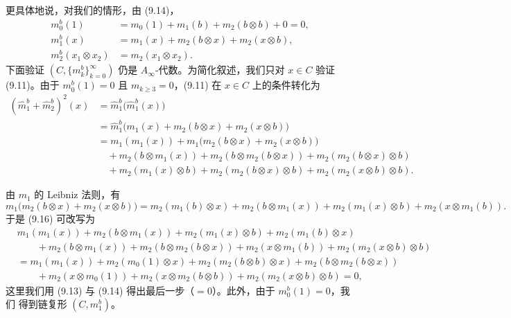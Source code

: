 更具体地说，对我们的情形，由 (9.14)，
\begin{equation*}
\begin{aligned}
  m_0^b(1)&=m_0(1)+m_1(b)+m_2(b\otimes b)+0=0,\\
  m_1^b(x)&=m_1(x)+m_2(b\otimes x)+m_2(x\otimes b),\\
  m_2^b(x_1\otimes x_2)&=m_2(x_1\otimes x_2).
\end{aligned}
\end{equation*}
下面验证 $(C,\{m_k^b\}_{k=0}^\infty)$ 仍是 $A_\infty$-代数。为简化叙述，我们只对
$x\in C$ 验证 (9.11)。由于 $m_0^b(1)=0$ 且 $m_{k\geqslant3}=0$，(9.11) 在
$x\in C$ 上的条件转化为
\begin{equation}\tag{9.16}
\begin{aligned}
  (\hat m_1^b+\hat m_2^b)^2(x)
  &=\hat m_1^b\bigl(\hat m_1^b(x)\bigr)\\
  &=\hat m_1^b\bigl(m_1(x)+m_2(b\otimes x)+m_2(x\otimes b)\bigr)\\
  &=m_1(m_1(x))+m_1\bigl(m_2(b\otimes x)+m_2(x\otimes b)\bigr)\\
  &\quad+m_2(b\otimes m_1(x))+m_2(b\otimes m_2(b\otimes x))
    +m_2(m_2(b\otimes x)\otimes b)\\
  &\quad+m_2(m_1(x)\otimes b)+m_2(m_2(b\otimes x)\otimes b)
    +m_2(m_2(x\otimes b)\otimes b).
\end{aligned}
\end{equation}

由 $m_1$ 的 Leibniz 法则，有
\begin{equation*}
  m_1\bigl(m_2(b\otimes x)+m_2(x\otimes b)\bigr)
  =m_2(m_1(b)\otimes x)+m_2(b\otimes m_1(x))
  +m_2(m_1(x)\otimes b)+m_2(x\otimes m_1(b)).
\end{equation*}
于是 (9.16) 可改写为
\begin{equation*}
\begin{aligned}
  &m_1(m_1(x))+m_2(b\otimes m_1(x))+m_2(m_1(x)\otimes b)+m_2(m_1(b)\otimes x)\\
  &\qquad+m_2(b\otimes m_1(x))+m_2(b\otimes m_2(b\otimes x))
    +m_2(x\otimes m_1(b))+m_2(m_2(x\otimes b)\otimes b)\\
  &=m_1(m_1(x))+m_2(m_0(1)\otimes x)+m_2(m_2(b\otimes b)\otimes x)
    +m_2(b\otimes m_2(b\otimes x))\\
  &\qquad+m_2(x\otimes m_0(1))+m_2(x\otimes m_2(b\otimes b))
    +m_2(m_2(x\otimes b)\otimes b)=0,
\end{aligned}
\end{equation*}
这里我们用 (9.13) 与 (9.14) 得出最后一步（$=0$）。此外，由于 $m_0^b(1)=0$，我们
得到链复形 $(C,m_1^b)$。

